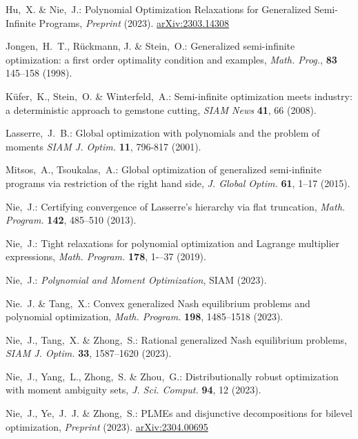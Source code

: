 \documentclass{amsart}
\theoremstyle{plain}
\numberwithin{equation}{section}
\begin{document}
\begin{thebibliography}{100}
			Hu,~X. \& Nie,~J.:
			Polynomial Optimization Relaxations for Generalized Semi-Infinite Programs,
			{\em Preprint} (2023). \url{arXiv:2303.14308}
			
			
			Jongen,~H.~T., R\"{u}ckmann, J. \& Stein,~O.:
			Generalized semi-infinite optimization: a first order optimality condition and examples,
			{\em Math. Prog.}, {\bf 83} 145--158 (1998).
			
			
			K\"{u}fer,~K., Stein,~O. \& Winterfeld,~A.: 
			Semi-infinite optimization meets industry: a deterministic approach to gemstone cutting,
			{\em SIAM News} \textbf{41}, 66 (2008).
			
			Lasserre,~J.~B.:
			Global optimization with polynomials and the problem of moments
			\emph{SIAM J. Optim.} \textbf{11}, 796-817 (2001).
			
			
			Mitsos,~A., Tsoukalas,~A.:
			Global optimization of generalized semi-infinite programs via restriction
			of the right hand side,
			{\em J. Global Optim.} \textbf{61}, 1--17 (2015).
			
			Nie,~J.:
			Certifying convergence of Lasserre's hierarchy via flat truncation,
			\emph{Math. Program.} \textbf{142},
			485–510 (2013).
			
			Nie,~J.:
			Tight relaxations for polynomial optimization and Lagrange multiplier expressions,
			{\em Math. Program.} \textbf{178}, 1-–37 (2019).
			
			Nie,~J.:
			{\em Polynomial and Moment Optimization},
			SIAM (2023).
			
			Nie.~J. \& Tang,~X.:
			Convex generalized Nash equilibrium problems and polynomial optimization,
			{\em Math. Program.} \textbf{198}, 1485--1518 (2023).
			
			Nie,~J., Tang,~X. \& Zhong,~S.: 
			Rational generalized Nash equilibrium problems, 
			{\em SIAM J. Optim.} \textbf{33}, 1587--1620 (2023).
			
			Nie,~J., Yang,~L., Zhong,~S. \& Zhou,~G.: 
			Distributionally robust optimization with moment ambiguity sets, 
			{\em J. Sci. Comput.} \textbf{94}, 12 (2023).
			
			Nie,~J., Ye,~J.~J. \& Zhong,~S.: 
			PLMEs and disjunctive decompositions for bilevel optimization,
			{\em Preprint} (2023). \url{arXiv:2304.00695}
			

\end{thebibliography}
\end{document}

